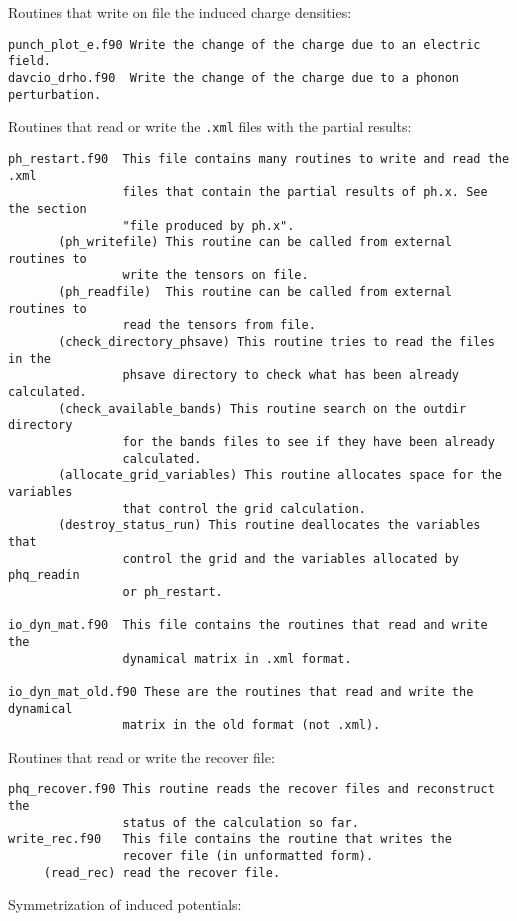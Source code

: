 \documentclass[12pt,a4paper]{article}
\begin{document}
Routines that write on file the induced charge densities:

\begin{verbatim}
punch_plot_e.f90 Write the change of the charge due to an electric field.
davcio_drho.f90  Write the change of the charge due to a phonon perturbation.  
\end{verbatim}

Routines that read or write the \texttt{.xml} files with the partial results:

\begin{verbatim}
ph_restart.f90  This file contains many routines to write and read the .xml
                files that contain the partial results of ph.x. See the section 
                "file produced by ph.x". 
       (ph_writefile) This routine can be called from external routines to
                write the tensors on file.
       (ph_readfile)  This routine can be called from external routines to
                read the tensors from file.
       (check_directory_phsave) This routine tries to read the files in the
                phsave directory to check what has been already calculated.
       (check_available_bands) This routine search on the outdir directory
                for the bands files to see if they have been already 
                calculated.
       (allocate_grid_variables) This routine allocates space for the variables
                that control the grid calculation.
       (destroy_status_run) This routine deallocates the variables that 
                control the grid and the variables allocated by phq_readin
                or ph_restart.

io_dyn_mat.f90  This file contains the routines that read and write the
                dynamical matrix in .xml format.

io_dyn_mat_old.f90 These are the routines that read and write the dynamical
                matrix in the old format (not .xml).
\end{verbatim}

Routines that read or write the recover file:

\begin{verbatim}
phq_recover.f90 This routine reads the recover files and reconstruct the
                status of the calculation so far.
write_rec.f90   This file contains the routine that writes the 
                recover file (in unformatted form).
     (read_rec) read the recover file.
\end{verbatim}

Symmetrization of induced potentials:
\end{document}

